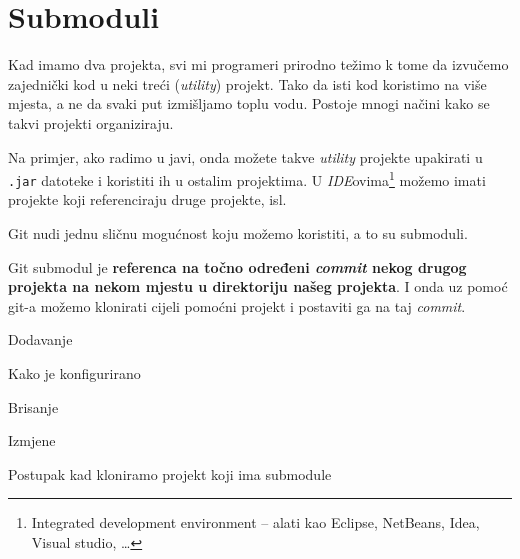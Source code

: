 \chapter*{Submoduli}

Kad imamo dva projekta, svi mi programeri prirodno težimo k tome da izvučemo zajednički kod u neki treći (\emph{utility}) projekt.
Tako da isti kod koristimo na više mjesta, a ne da svaki put izmišljamo toplu vodu.
Postoje mnogi načini kako se takvi projekti organiziraju.

Na primjer, ako radimo u javi, onda možete takve \emph{utility} projekte upakirati u \verb+.jar+ datoteke i koristiti ih u ostalim projektima.
U \emph{IDE}ovima\footnote{Integrated development environment -- alati kao Eclipse, NetBeans, Idea, Visual studio, \dots} možemo imati projekte koji referenciraju druge projekte, isl.

Git nudi jednu sličnu mogućnost koju možemo koristiti, a to su submoduli.

Git submodul je \textbf{referenca na točno određeni \emph{commit} nekog drugog projekta na nekom mjestu u direktoriju našeg projekta}.
I onda uz pomoć git-a možemo klonirati cijeli pomoćni projekt i postaviti ga na taj \emph{commit}.

\TODO Dodavanje

\TODO Kako je konfigurirano

\TODO Brisanje

\TODO Izmjene

\TODO Postupak kad kloniramo projekt koji ima submodule


